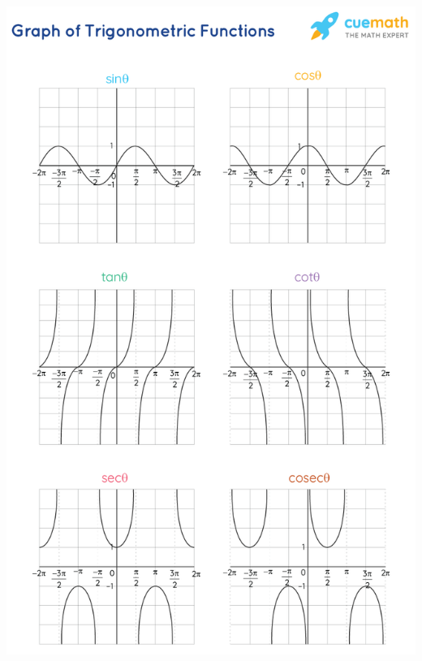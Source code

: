 \documentclass[8pt]{article}
\begin{document}
\begin{multicols*}{3}
\begin{minipage}{\linewidth-2cm}
      \includegraphics[width=\linewidth]{./media/trig_functions.png}
    \end{minipage}


\end{multicols*}
\end{document}
